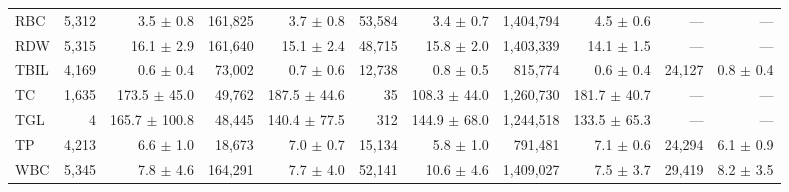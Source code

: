 \begin{table}[ht]
\begin{tabular}{lrrrrrrrrrr}
RBC & 5,312 & 3.5 $\pm$ 0.8 & 161,825 & 3.7 $\pm$ 0.8 & 53,584 & 3.4 $\pm$ 0.7 & 1,404,794 & 4.5 $\pm$ 0.6 & --- & --- \\
RDW & 5,315 & 16.1 $\pm$ 2.9 & 161,640 & 15.1 $\pm$ 2.4 & 48,715 & 15.8 $\pm$ 2.0 & 1,403,339 & 14.1 $\pm$ 1.5 & --- & --- \\
TBIL & 4,169 & 0.6 $\pm$ 0.4 & 73,002 & 0.7 $\pm$ 0.6 & 12,738 & 0.8 $\pm$ 0.5 & 815,774 & 0.6 $\pm$ 0.4 & 24,127 & 0.8 $\pm$ 0.4 \\
TC & 1,635 & 173.5 $\pm$ 45.0 & 49,762 & 187.5 $\pm$ 44.6 & 35 & 108.3 $\pm$ 44.0 & 1,260,730 & 181.7 $\pm$ 40.7 & --- & --- \\
TGL & 4 & 165.7 $\pm$ 100.8 & 48,445 & 140.4 $\pm$ 77.5 & 312 & 144.9 $\pm$ 68.0 & 1,244,518 & 133.5 $\pm$ 65.3 & --- & --- \\
TP & 4,213 & 6.6 $\pm$ 1.0 & 18,673 & 7.0 $\pm$ 0.7 & 15,134 & 5.8 $\pm$ 1.0 & 791,481 & 7.1 $\pm$ 0.6 & 24,294 & 6.1 $\pm$ 0.9 \\
WBC & 5,345 & 7.8 $\pm$ 4.6 & 164,291 & 7.7 $\pm$ 4.0 & 52,141 & 10.6 $\pm$ 4.6 & 1,409,027 & 7.5 $\pm$ 3.7 & 29,419 & 8.2 $\pm$ 3.5 \\
\bottomrule
\end{tabular}
\label{tab:03_cohort}
\end{table}